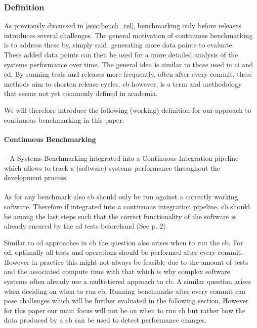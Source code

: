 \documentclass[	runningheads,
				a4paper]{llncs}
\begin{document}
	\subsubsection{Definition}
	As previously discussed in \autoref{ssec:bench_rel}, benchmarking only before releases introduces several challenges. The general motivation of continuous benchmarking is to address these by, simply said, generating more data points to evaluate. These added data points can then be used for a more detailed analysis of the systems performance over time. The general idea is similar to those used in \gls{ci} and \gls{cd}. By running tests and releases more frequently, often after every commit, these methods aim to shorten release cycles. \gls{cb} however, is a term and methodology that seems not yet commonly defined in academia.

	We will therefore introduce the following (working) definition for our approach to continuous benchmarking in this paper:
	\paragraph{Continuous Benchmarking} -- A Systems Benchmarking integrated into a Continuous Integration pipeline which allows to track a (software) systems performance throughout the development process.

	\paragraph{}As for any benchmark also \gls{cb} should only be run against a correctly working software. Therefore if integrated into a continuous integration pipeline, \gls{cb} should be among the last steps such that the correct functionality of the software is already ensured by the \gls{cd} tests beforehand (See \cite{grambow2019} p. 2).

	Similar to \gls{cd} approaches in \gls{cb} the question also arises when to run the \gls{cb}. For \gls{cd}, optimally all tests and operations should be performed after every commit. However in practice this might not always be feasible due to the amount of tests and the associated compute time with that which is why complex software systems often already use a multi-tiered approach to \gls{cb}. A similar question arises when deciding on when to run \gls{cb}. Running benchmarks after every commit can pose challenges which will be further evaluated in the following section. However for this paper our main focus will not be on when to run \gls{cb} but rather how the data produced by a \gls{cb} can be used to detect performance changes.
\end{document}
